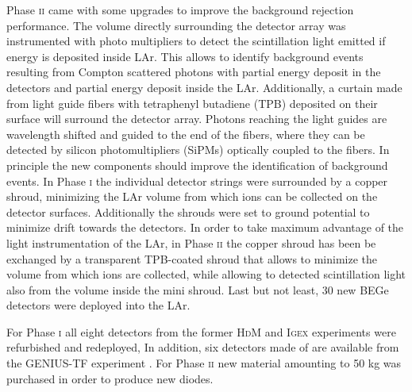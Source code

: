 Phase \textsc{ii} came with some upgrades to improve the background rejection performance. The volume directly surrounding the detector array was instrumented with photo multipliers to detect the scintillation light emitted if energy is deposited inside LAr. This allows to identify background events resulting from Compton scattered photons with partial energy deposit in the detectors and partial energy deposit inside the LAr. Additionally, a curtain made from light guide fibers with tetraphenyl butadiene (TPB) deposited on their surface will surround the detector array. Photons reaching the light guides are wavelength shifted and guided to the end of the fibers, where they can be detected by silicon photomultipliers (SiPMs) optically coupled to the fibers. In principle the new components should improve the identification of background events. In Phase \textsc{i} the individual detector strings were surrounded by a copper shroud, minimizing the LAr volume from which  ions can be collected on the detector surfaces. Additionally the shrouds were set to ground potential to minimize drift towards the detectors. In order to take maximum advantage of the light instrumentation of the LAr, in Phase \textsc{ii} the copper shroud has been be exchanged by a transparent TPB-coated shroud that allows to minimize the volume from which  ions are collected, while allowing to detected scintillation light also from the volume inside the mini shroud. Last but not least, 30 new BEGe detectors were deployed into the LAr.

 For Phase \textsc{i} all eight detectors from the former \textsc{HdM} \cite{hdm}and \textsc{Igex} \cite{igex} experiments were refurbished and redeployed, In addition, six detectors made of  are available from the GENIUS-TF experiment \cite{genius1, genius2}. For Phase \textsc{ii} new material amounting to 50 kg  was purchased in order to produce new diodes.
